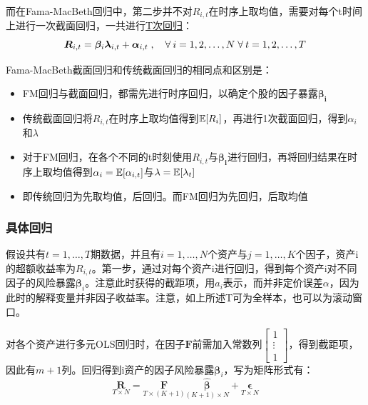 \documentclass[11pt]{article}
\begin{document}
而在Fama-MacBeth回归中，第二步并不对$R_{i,t}$在时序上取均值，需要对每个t时间上进行一次截面回归，一共进行\uline{T次回归}：
\begin{equation*}
    \bm{R}_{i,t} = \bm{\beta}_{i} \bm{\lambda}_{i,t} + \bm{\alpha}_{i,t} \inlinesep \forall i=1,2,\dots,N  \;\forall t=1,2,\dots,T
\end{equation*}

Fama-MacBeth截面回归和传统截面回归的相同点和区别是：
\begin{itemize}
    \item FM回归与截面回归，都需先进行时序回归，以确定个股的因子暴露$\bm{\beta_i}$
    \item 传统截面回归将$R_{i,t}$在时序上取均值得到$\mathbb{E}[R_i]$，再进行1次截面回归，得到$\alpha_i$和$\lambda$
    \item 对于FM回归，在各个不同的t时刻使用$R_{i,t}$与$\bm{\beta_{i}}$进行回归，再将回归结果在时序上取均值得到$\alpha_i = \mathbb{E}[\alpha_{i,t}]$与$\lambda=\mathbb{E}[\lambda_t]$
    \item 即传统回归为先取均值，后回归。而FM回归为先回归，后取均值
\end{itemize}

\subsubsection{具体回归}

假设共有$t=1,\dots,T$期数据，并且有$i=1,\dots,N$个资产与$j=1,\dots,K$个因子，资产i的超额收益率为$R_{i,t}$。第一步，通过对每个资产i进行回归，得到每个资产i对不同因子的风险暴露$\bm{\beta}_i$。注意此时获得的截距项，用$a_i$表示，而并非定价误差$\alpha$，因为此时的解释变量并非因子收益率。注意，如上所述T可为全样本，也可以为滚动窗口。

对各个资产进行多元OLS回归时，在因子$\bm{F}$前需加入常数列$\begin{bmatrix}1 \\ \vdots \\ 1\end{bmatrix}$，得到截距项，因此有$m+1$列。回归得到i资产的因子风险暴露$\bm{\beta}_i$，写为矩阵形式有：
\begin{equation*}
    \underset{T \times N}{\bm{R}} = \underset{T\times(K+1)}{\bm{F}} \underset{(K+1)\times N}{\hat{\bm{\beta}}} + \underset{T\times N}{\bm{\epsilon}}
\end{equation*}
\end{document}
